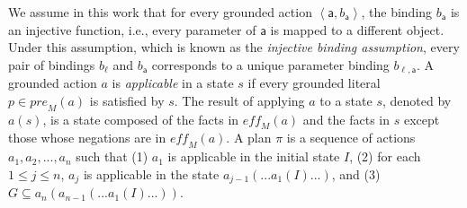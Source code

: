 \documentclass[letterpaper]{article} %
\newcommand{\pre}{\textit{pre}}
\newcommand{\eff}{\textit{eff}}
\theoremstyle{definition}
\theoremstyle{remark}
\newcommand{\tuple}[1]{\ensuremath{\left \langle #1 \right \rangle }}
\newcommand{\params}{\textit{params}}
\newcommand{\liftl}{\ensuremath{\ell}}
\newcommand{\lifta}{\mathsf{a}}
\newcommand{\bindings}{\textit{bindings}}
\begin{document}
We assume in this work that for every grounded action $\tuple{\lifta, b_\lifta}$,
the binding $b_\lifta$ is an injective function, i.e., every parameter of $\lifta$ is mapped to a different object.
Under this assumption, which is known as the \emph{injective binding assumption},
every pair of bindings $b_\liftl$ and $b_\lifta$ corresponds to a unique parameter binding $b_{\liftl,\lifta}$. %
A grounded action $a$ is \emph{applicable} in a state $s$ if every grounded literal $p\in \pre_M(a)$ is satisfied by $s$.
The result of applying $a$ to a state $s$, denoted by $a(s)$, is a state composed of the facts in $\eff_M(a)$ and the facts in $s$ except those whose negations are in $\eff_M(a)$.
A plan $\pi$ is a sequence of actions $a_1,a_2,...,a_n$ such that
(1) $a_1$ is applicable in the initial state $I$,
(2) for each $1 \leq j \leq n$, $a_j$ is applicable in the state $a_{j-1}(...a_1(I)...)$,
and (3) $G\subseteq a_n(a_{n-1}(...a_1(I)...))$.
\end{document}
